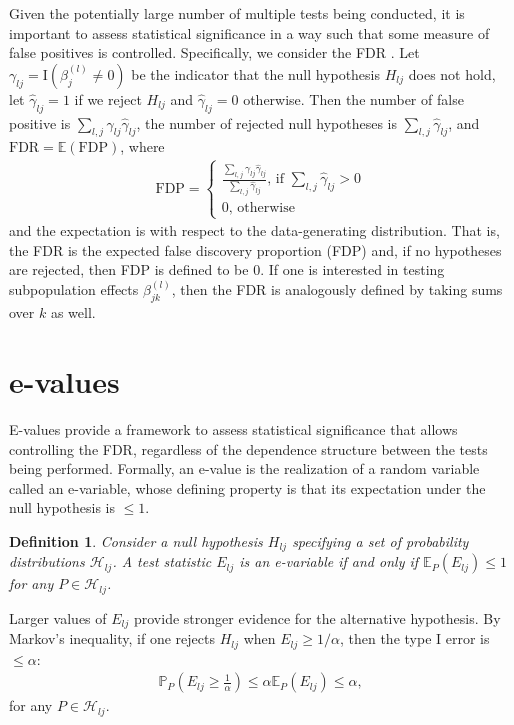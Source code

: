 \documentclass[pdflatex,sn-mathphys-num]{sn-jnl}%
\theoremstyle{thmstyleone}%
\theoremstyle{thmstyletwo}%
\theoremstyle{thmstylethree}%
\newtheorem{definition}{Definition}%
\begin{document}
Given the potentially large number of multiple tests being conducted, it is important to assess statistical significance in a way such that some measure of false positives is controlled.
Specifically, we consider the FDR \citep{benjamini:1995}. Let $\gamma_{lj}= \mbox{I}(\beta_j^{(l)} \neq 0)$ be the indicator that the null hypothesis $H_{lj}$ does not hold, let $\hat{\gamma}_{lj} = 1$ if we reject $H_{lj}$ and $\hat{\gamma}_{lj}=0$ otherwise. 
Then the number of false positive is $\sum_{l,j} \gamma_{lj} \hat{\gamma}_{lj}$, the number of rejected null hypotheses is $\sum_{l,j} \hat{\gamma}_{lj}$, and $\mbox{FDR}= \mathbb E(\mbox{FDP})$, where 
\begin{align}
 \mbox{FDP}= \begin{cases}
\frac{\sum_{l,j} \gamma_{lj} \hat{\gamma}_{lj}}{\sum_{l,j} \hat{\gamma}_{lj}} \mbox{, if } \sum_{l,j} \hat{\gamma}_{lj} > 0
\nonumber \\
0  \mbox{, otherwise} 
\end{cases}
\nonumber
\end{align}
and the expectation is with respect to the data-generating distribution.
That is, the FDR is the expected false discovery proportion (FDP) and, if no hypotheses are rejected, then FDP is defined to be 0.
If one is interested in testing subpopulation effects $\beta_{jk}^{(l)}$, then the FDR is analogously defined by taking sums over $k$ as well.



\section{e-values}
\label{sec:evalues}

E-values provide a framework to assess statistical significance that allows controlling the FDR, regardless of the dependence structure between the tests being performed.
Formally, an e-value is the realization of a random variable called an e-variable, whose defining property is that its expectation under the null hypothesis is $\leq 1$.

\begin{definition}
Consider a null hypothesis $H_{lj}$ specifying a set of probability distributions $\mathcal{H}_{lj}$.
A test statistic $E_{lj}$ is an e-variable if and only if
$\mathbb E_P (E_{lj}) \leq 1$ for any $P \in \mathcal{H}_{lj}$.
\label{def:evariable}
\end{definition}

Larger values of $E_{lj}$ provide stronger evidence for the alternative hypothesis.
By Markov's inequality, if one rejects $H_{lj}$ when $E_{lj} \geq 1/\alpha$, then the type I error is $\leq \alpha$:
\begin{align}
 \mathbb P_P \left( E_{lj} \geq \frac{1}{\alpha} \right) \leq \alpha \mathbb E_P(E_{lj}) \leq \alpha,
\nonumber
\end{align}
for any $P \in \mathcal{H}_{lj}$.
\end{document}
